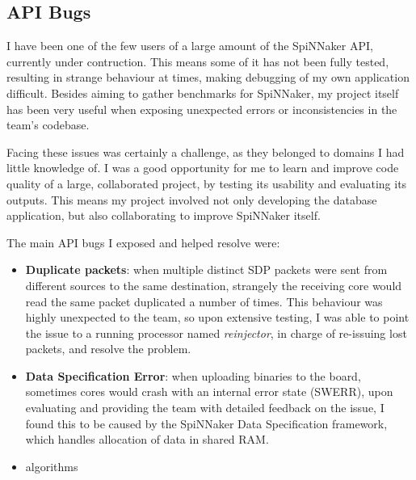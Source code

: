 \subsection{API Bugs}
I have been one of the few users of a large amount of the SpiNNaker API, currently under contruction. This means some of it has not been fully tested, resulting in strange behaviour at times, making debugging of my own application difficult. Besides aiming to gather benchmarks for SpiNNaker, my project itself has been very useful when exposing unexpected errors or inconsistencies in the team's codebase.

Facing these issues was certainly a challenge, as they belonged to domains I had little knowledge of. I was a good opportunity for me to learn and improve code quality of a large, collaborated project, by testing its usability and evaluating its outputs. This means my project involved not only developing the database application, but also collaborating to improve SpiNNaker itself.

The main API bugs I exposed and helped resolve were:

\begin{itemize}
\item \textbf{Duplicate packets}: when multiple distinct SDP packets were sent from different sources to the same destination, strangely the receiving core would read the same packet duplicated a number of times. This behaviour was highly unexpected to the team, so upon extensive testing, I was able to point the issue to a running processor named \textit{reinjector}, in charge of re-issuing lost packets, and resolve the problem. 

\item \textbf{Data Specification Error}: when uploading binaries to the board, sometimes cores would crash with an internal error state (SWERR), upon evaluating and providing the team with detailed feedback on the issue, I found this to be caused by the SpiNNaker Data Specification framework, which handles allocation of data in shared RAM.

\item algorithms

\end{itemize}




